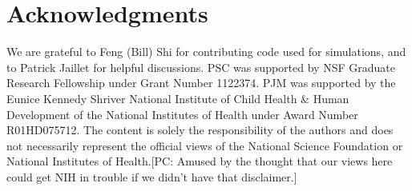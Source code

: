 \documentclass[review, onefignum, onetabnum]{siamart171218}
\newcommand{\pc}[1]{{\color{comment_purple}[PC: #1]}}
\begin{document}
	
\section*{Acknowledgments} 
	We are grateful to Feng (Bill) Shi for contributing code used for simulations, and to Patrick Jaillet for helpful discussions. PSC was supported by NSF Graduate Research Fellowship under Grant Number 1122374. PJM was supported by the Eunice Kennedy Shriver National Institute of Child Health \& Human Development of the National Institutes of Health under Award Number R01HD075712. The content is solely the responsibility of the authors and does not necessarily represent the official views of the National Science Foundation or National Institutes of Health.\pc{Amused by the thought that our views here could get NIH in trouble if we didn't have that disclaimer.}



{}
\end{document}
